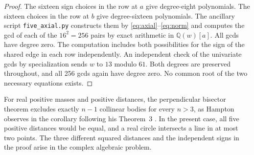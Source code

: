 \documentclass[11pt]{article}
\begin{document}
\begin{proof}
The sixteen sign choices in the row at $a$ give degree-eight polynomials. The sixteen choices in the row at $b$ give degree-sixteen polynomials. The ancillary script \texttt{five\_axial.py} constructs them by \eqref{eq:axial}--\eqref{eq:norm} and computes the gcd of each of the $16^2=256$ pairs by exact arithmetic in $\mathbb Q(w)[a]$. All gcds have degree zero. The computation includes both possibilities for the sign of the shared edge in each row independently. An independent check of the univariate gcds by specialization sends $w$ to $13$ modulo $61$. Both degrees are preserved throughout, and all 256 gcds again have degree zero. No common root of the two necessary equations exists.
\end{proof}
For real positive masses and positive distances, the perpendicular bisector theorem excludes exactly $n-1$ collinear bodies for every $n>3$, as Hampton observes in the corollary following his Theorem~3 \cite[Ch.~4]{hampton}. In the present case, all five positive distances would be equal, and a real circle intersects a line in at most two points. The three different squared distances and the independent signs in the proof arise in the complex algebraic problem.
\end{document}
